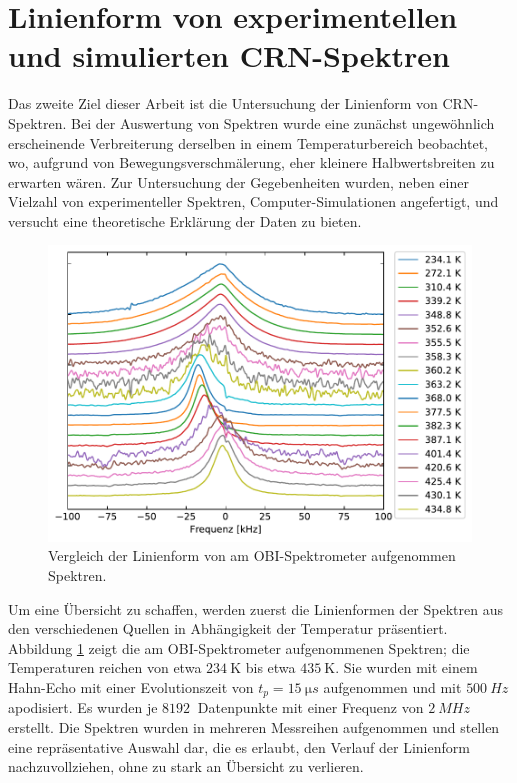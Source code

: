 \section{Linienform von experimentellen und simulierten CRN-Spektren} \label{section:res:spektren}

Das zweite Ziel dieser Arbeit ist die Untersuchung der Linienform von CRN-Spektren. Bei der Auswertung von Spektren wurde eine zunächst ungewöhnlich erscheinende Verbreiterung derselben in einem Temperaturbereich beobachtet, wo, aufgrund von Bewegungsverschmälerung, eher kleinere Halbwertsbreiten zu erwarten wären. Zur Untersuchung der Gegebenheiten wurden, neben einer Vielzahl von experimenteller Spektren, Computer-Simulationen angefertigt, und versucht eine theoretische Erklärung der Daten zu bieten.

\begin{figure}
	\begin{center}
		\includegraphics[width=\textwidth]{graphics/plot/spek_lineshape.pdf}
	\end{center}
	\caption{Vergleich der Linienform von am OBI-Spektrometer aufgenommen Spektren.} \label{fig:res:spek_linienform}
\end{figure}
Um eine Übersicht zu schaffen, werden zuerst die Linienformen der Spektren aus den verschiedenen Quellen in Abhängigkeit der Temperatur präsentiert. Abbildung \ref{fig:res:spek_linienform} zeigt die am OBI-Spektrometer aufgenommenen Spektren; die Temperaturen reichen von etwa $\SI{234}{\kelvin}$ bis etwa $\SI{435}{\kelvin}$. Sie wurden mit einem Hahn-Echo mit einer Evolutionszeit von $t_p = \SI{15}{\micro s}$ aufgenommen und mit $\SI{500}{Hz}$ apodisiert. Es wurden je $\SI{8192}{}$ Datenpunkte mit einer Frequenz von $\SI{2}{MHz}$ erstellt. Die Spektren wurden in mehreren Messreihen aufgenommen und stellen eine repräsentative Auswahl dar, die es erlaubt, den Verlauf der Linienform nachzuvollziehen, ohne zu stark an Übersicht zu verlieren.

